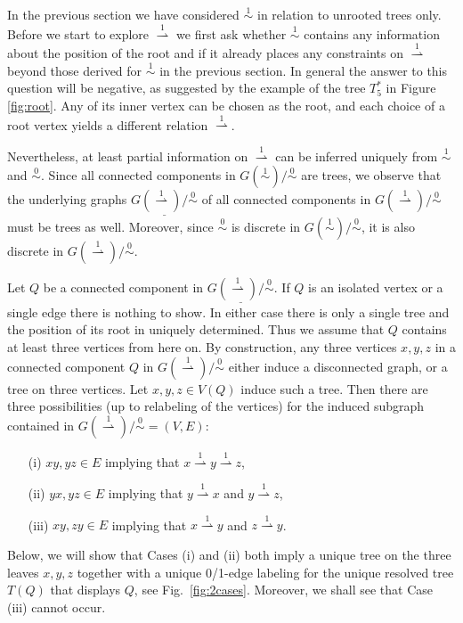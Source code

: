 \documentclass[smallextended]{svjour3}
\newcommand{\Ro}{\mathrel{\overset{0}{\sim}}}
\newcommand{\Rl}{\mathrel{\overset{1}{\sim}}}
\newcommand{\Rld}{\mathrel{\overset{1}{\rightharpoonup}}}
\begin{document}
In the previous section we have considered $\Rl$ in relation to unrooted
trees only. Before we start to explore $\Rld$ we first ask whether $\Rl$
contains any information about the position of the root and if it already
places any constraints on $\Rld$ beyond those derived for $\Rl$ in the
previous section. In general the answer to this question will be negative,
as suggested by the example of the tree $T_5^*$ in Figure
\ref{fig:root}. Any of its inner vertex can be chosen as the root, and
each choice of a root vertex yields a different relation $\Rld$.

Nevertheless, at least partial information on $\Rld$ can be inferred
uniquely from $\Rl$ and $\Ro$. Since all connected components in
$G(\Rl)/\Ro$ are trees, we observe that the underlying graphs
$\underline{G(\Rld)/\Ro}$ of all connected components in $G(\Rld)/\Ro$ must
be trees as well.  Moreover, since $\Ro$ is discrete in $G(\Rl)/\Ro$, it is
also discrete in $G(\Rld)/\Ro$.

Let $Q$ be a connected component in $\underline{G(\Rld)/\Ro}$. If $Q$ is an
isolated vertex or a single edge there is nothing to show. In either case
there is only a single tree and the position of its root in uniquely
determined. Thus we assume that $Q$ contains at least three vertices from
here on. By construction, any three vertices $x,y,z$ in a connected
component $Q$ in $G(\Rld)/\Ro$ either induce a disconnected graph, or a
tree on three vertices.  Let $x,y,z\in V(Q)$ induce such a tree. Then there
are three possibilities (up to relabeling of the vertices) for the induced
subgraph contained in $G(\Rld)/\Ro = (V,E)$:
\begin{itemize}
\item[(i)] $xy, yz \in E$ implying that $x\Rld y \Rld z$, 
\item[(ii)] $yx, yz \in E$ implying that $y\Rld x$ and $y \Rld z$,
\item[(iii)] $xy, zy \in E$ implying that $x\Rld y$ and $z \Rld y$. 
\end{itemize}
Below, we will show that Cases (i) and (ii) both imply a unique tree on the
three leaves $x,y,z$ together with a unique 0/1-edge labeling for the
unique resolved tree $T(Q)$ that displays $Q$, see Fig.\
\ref{fig:2cases}. Moreover, we shall see that Case (iii) cannot occur.
\end{document}
